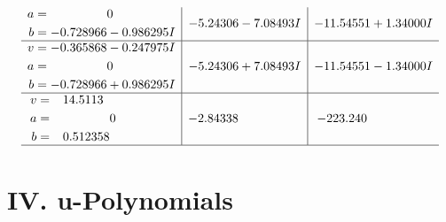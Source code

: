 \documentclass[1p]{elsarticle_modified}
\theoremstyle{definition}
\begin{document}
$$\begin{array}{c|c|c}
\begin{aligned}
a &= \phantom{-0.000000 } 0 \\
b &= -0.728966 - 0.986295 I\end{aligned}
 & -5.24306 - 7.08493 I & -11.54551 + 1.34000 I \\ \hline\begin{aligned}
v &= -0.365868 - 0.247975 I \\
a &= \phantom{-0.000000 } 0 \\
b &= -0.728966 + 0.986295 I\end{aligned}
 & -5.24306 + 7.08493 I & -11.54551 - 1.34000 I \\ \hline\begin{aligned}
v &= \phantom{-}14.5113\phantom{ +0.000000I} \\
a &= \phantom{-0.000000 } 0 \\
b &= \phantom{-}0.512358\phantom{ +0.000000I}\end{aligned}
 & -2.84338\phantom{ +0.000000I} & -223.240\phantom{ +0.000000I}\\
 \hline 
 \end{array}$$\newpage
\newpage\renewcommand{\arraystretch}{1}
\centering \section*{ IV. u-Polynomials}
\end{document}
